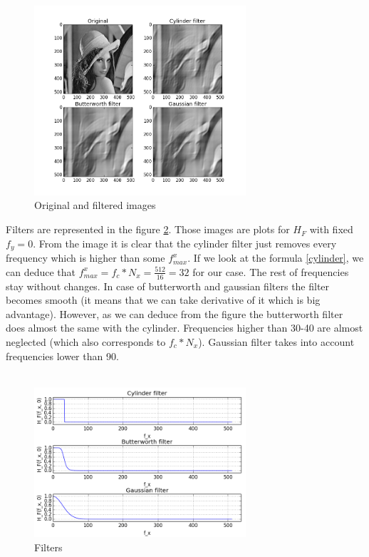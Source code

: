 \documentclass[a4paper]{article}
\begin{document}
\begin{figure}
    \centering
    \includegraphics[width=0.7\textwidth]{filtered_images.png}
    \caption{Original and filtered images}
    \label{filtered_images}
\end{figure}
Filters are represented in the figure \ref{filters}. Those images are plots for $H_F$ with fixed $f_y=0$. From the image it is clear that the cylinder filter just removes every frequency which is higher than some $f_{max}^x$. If we look at the formula \ref{cylinder}, we can deduce that $f_{max}^x = f_c * N_x = \frac{512}{16} = 32$ for our case. The rest of frequencies stay without changes. In case of butterworth and gaussian filters the filter becomes smooth (it means that we can take derivative of it which is big advantage). However, as we can deduce from the figure the butterworth filter does almost the same with the cylinder. Frequencies higher than 30-40 are almost neglected (which also corresponds to $f_c * N_x$). Gaussian filter takes into account frequencies lower than 90.\\\\
\begin{figure}
    \centering
    \includegraphics[width=0.7\textwidth]{filters.png}
    \caption{Filters}
    \label{filters}
\end{figure}
\end{document}
